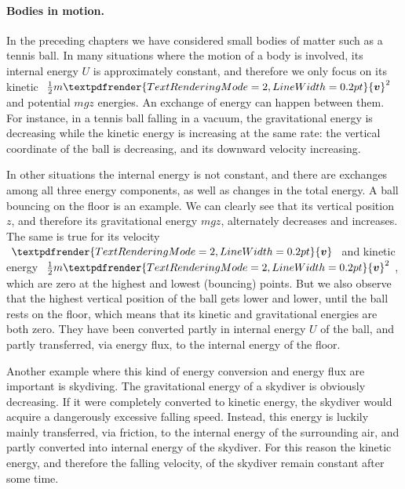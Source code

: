\documentclass[a4paper,12pt,%
onecolumn,oneside,%
british%
]{memoir}
\renewcommand*{\bm}[1]{\textpdfrender{TextRenderingMode=2,LineWidth=0.2pt}{\boldsymbol{#1}}}
\renewcommand*{\|}[1][]{\nonscript\:#1\vert\nonscript\:\mathopen{}}
\newcommand*{\yv}{\bm{v}}
\newcommand*{\ym}{m}%
\newcommand*{\yU}{U}
\begin{document}
\paragraph{Bodies in motion.}

In the preceding chapters we have considered small bodies of matter such as a tennis ball. In many situations where the motion of a body is involved, its internal energy $\yU$ is approximately constant, and therefore we only focus on its kinetic $\tfrac{1}{2}\ym \yv^{2}$ and potential $\ym g z$ energies. An exchange of energy can happen between them. For instance, in a tennis ball falling in a vacuum, the gravitational energy is decreasing while the kinetic energy is increasing at the same rate: the vertical coordinate of the ball is decreasing, and its downward velocity increasing.

In other situations the internal energy is not constant, and there are exchanges among all three energy components, as well as changes in the total energy. A ball bouncing on the floor is an example. We can clearly see that its vertical position $z$, and therefore its gravitational energy $\ym g z$, alternately decreases and increases. The same is true for its velocity $\yv$ and kinetic energy $\tfrac{1}{2}\ym \yv^{2}$, which are zero at the highest and lowest (bouncing) points. But we also observe that the highest vertical position of the ball gets lower and lower, until the ball rests on the floor, which means that its kinetic and gravitational energies are both zero. They have been converted partly in internal energy $\yU$ of the ball, and partly transferred, via energy flux, to the internal energy of the floor.

Another example where this kind of energy conversion and energy flux are important is skydiving. The gravitational energy of a skydiver is obviously decreasing. If it were completely converted to kinetic energy, the skydiver would acquire a dangerously excessive falling speed. Instead, this energy is luckily mainly transferred, via friction, to the internal energy of the surrounding air, and partly converted into internal energy of the skydiver. For this reason the kinetic energy, and therefore the falling velocity, of the skydiver remain constant after some time.
%
%
\end{document}
